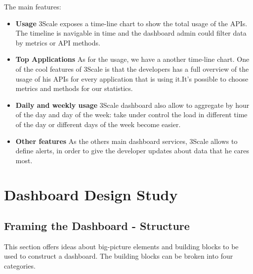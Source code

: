 \documentclass[a4paper,13pt]{report}
\begin{document}
The main features:
\begin{itemize}
\item \textbf{Usage}\newline
 3Scale exposes a time-line chart to show the total usage of the APIs. The timeline is navigable in time and the dashboard admin could filter data by  metrics or API methods.

\item  \textbf{Top Applications}\newline
As for the usage, we have a another time-line chart. One of the cool features of 3Scale is that the developers has a full overview of the usage of his APIs for every application that is using it.It's possible to choose metrics and methods for our statistics.

\item \textbf{Daily and weekly usage}\newline
 3Scale dashboard also allow to aggregate by hour of the day and day of the week: take under control the load in different time of the day or different days of the week become easier.


\item \textbf{Other features}\newline
As the others main dashboard services, 3Scale allows to define alerts, in order to give the developer updates about data that he cares most.
\end{itemize}

\chapter{Dashboard Design Study}
\section{Framing the Dashboard - Structure}
This section offers ideas about big-picture elements and building blocks to be used to construct a dashboard. \newline The building blocks can be broken into four categories.
\end{document}
